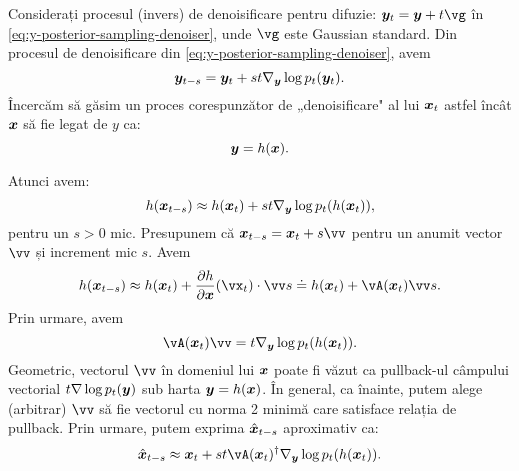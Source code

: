 \documentclass[../../book-main_ro.tex]{subfiles}
\begin{document}
Considerați procesul (invers) de denoisificare pentru difuzie: $\y_t = \y + t\vg $ în \eqref{eq:y-posterior-sampling-denoiser}, unde $\vg$ este Gaussian standard. Din procesul de denoisificare din \eqref{eq:y-posterior-sampling-denoiser}, avem
\begin{equation}
    \bm{y}_{t-s} =  \bm{y}_t + st \nabla_{\bm{y}} \log p_t(\bm{y}_t).
\end{equation}
Încercăm să găsim un proces corespunzător de „denoisificare" al lui $\bm{x}_t$ astfel încât $\bm{x}$ să fie legat de $y$ ca:
\begin{equation}
    \bm{y} =  h(\bm{x}).
\end{equation}

Atunci avem:
\begin{equation}
    h(\bm{x}_{t-s}) \approx  h(\bm{x}_t) + st \nabla_{\bm{y}} \log p_t(h(\bm{x}_t)),
\end{equation}
pentru un $s >0$ mic.
Presupunem că $\x_{t-s} = \x_t + s \vv$ pentru un anumit vector $\vv$ și increment mic $s$. Avem
\begin{equation}
    h(\x_{t-s}) \approx h(\x_t) + \frac{\partial h}{\partial \x}(\vx_{t}) \cdot \vv s \doteq h(\x_t) + \vA(\x_t) \vv s. 
\end{equation}
Prin urmare, avem
\begin{equation}
    \vA(\x_t) \vv = t \nabla_{\y} \log p_t(h(\x_t)).
    \label{eqn:pushforward}
\end{equation}
Geometric, vectorul $\vv$ în domeniul lui $\bm{x}$ poate fi văzut ca pullback-ul câmpului vectorial $t \nabla \log p_t(\bm{y})$ sub harta $\bm{y} = h(\bm{x})$. În general, ca înainte, putem alege (arbitrar) $\vv$ să fie vectorul cu norma 2 minimă care satisface relația de pullback. Prin urmare, putem exprima $\hat{\bm{x}}_{t-s}$ aproximativ ca:
\begin{equation}
    \hat{\x}_{t-s} \approx \x_t + st\vA(\x_t)^\dagger \nabla_{\y} \log p_t(h(\x_t)). 
\label{eqn:pullback-denoise}
\end{equation}
\end{document}
